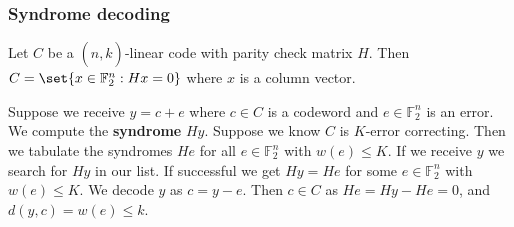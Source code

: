 \documentclass{article}
\newcommand{\1}[1]{\mathbbm{1}_{#1}}
\begin{document}
\subsubsection*{Syndrome decoding}
Let $C$ be a $(n, \hat{k})$-linear code with parity check matrix $H$. Then $C = \set{x \in \mathbb{F}_2^n : Hx = 0}$ where $x$ is a column vector.

Suppose we receive $y = c +e$ where $c \in C$ is a codeword and $e\in \mathbb{F}_2^n$ is an error.
We compute the \textbf{syndrome} $Hy$.
Suppose we know $C$ is $K$-error correcting. Then we tabulate the syndromes $He$ for all $e \in \mathbb{F}_2^n$ with $w(e) \leq K$.
If we receive $y$ we search for $Hy$ in our list. If successful we get $Hy = He$ for some $e \in \mathbb{F}_2^n$ with $w(e) \leq K$.
We decode $y$ as $c = y-e$. Then $c \in C$ as $He = Hy - He = 0$, and $d(y, c) = w(e) \leq k$.
\end{document}
